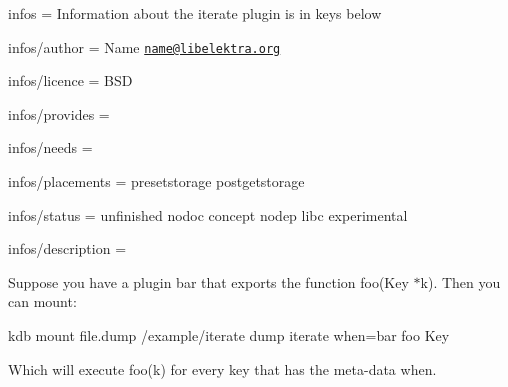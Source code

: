 
\begin{DoxyItemize}
\item infos = Information about the iterate plugin is in keys below
\item infos/author = Name \href{mailto:name@libelektra.org}{\tt name@libelektra.\+org}
\item infos/licence = B\+S\+D
\item infos/provides =
\item infos/needs =
\item infos/placements = presetstorage postgetstorage
\item infos/status = unfinished nodoc concept nodep libc experimental
\item infos/description =
\end{DoxyItemize}

Suppose you have a plugin bar that exports the function {\ttfamily foo(\+Key $\ast$k)}. Then you can mount\+: \begin{DoxyVerb}kdb mount file.dump /example/iterate dump iterate when=bar foo Key
\end{DoxyVerb}


Which will execute {\ttfamily foo(k)} for every key that has the meta-\/data {\ttfamily when}. 